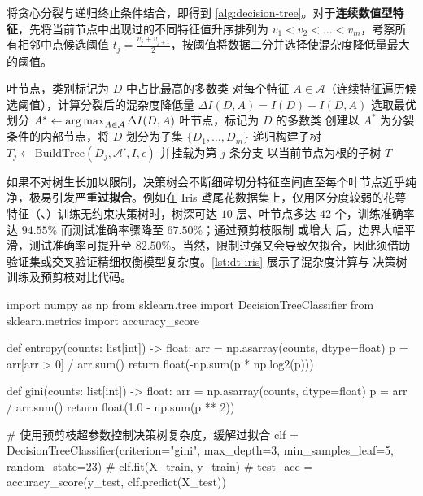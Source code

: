 将贪心分裂与递归终止条件结合，即得到 \cref{alg:decision-tree}。对于\textbf{连续数值型特征}，先将当前节点中出现过的不同特征值升序排列为 $v_1 < v_2 < \dots < v_m$，考察所有相邻中点候选阈值 $t_j = \frac{v_j + v_{j+1}}{2}$，按阈值将数据二分并选择使混杂度降低量最大的阈值。

\begin{algorithm}[决策树贪心递归构建算法]\label{alg:decision-tree}
\begin{algsteps}
    \State \Return 叶节点，类别标记为 $D$ 中占比最高的多数类
  \EndIf
  \State 对每个特征 $A\in\mathcal{A}$（连续特征遍历候选阈值），计算分裂后的混杂度降低量 $\Delta I(D, A) = I(D) - I(D, A)$
  \State 选取最优划分 $A^* \gets \operatorname*{arg\,max}_{A\in\mathcal{A}} \Delta I(D, A)$
    \State \Return 叶节点，标记为 $D$ 的多数类
  \EndIf
  \State 创建以 $A^*$ 为分裂条件的内部节点，将 $D$ 划分为子集 $\{D_1, \dots, D_m\}$
    \State 递归构建子树 $T_j \gets \text{BuildTree}(D_j, \mathcal{A}', I, \epsilon)$ 并挂载为第 $j$ 条分支
  \EndFor
  \State \Return 以当前节点为根的子树 $T$
\end{algsteps}
\end{algorithm}

如果不对树生长加以限制，决策树会不断细碎切分特征空间直至每个叶节点近乎纯净，极易引发严重\textbf{过拟合}。例如在 Iris 鸢尾花数据集上，仅用区分度较弱的花萼特征（、）训练无约束决策树时，树深可达 $10$ 层、叶节点多达 $42$ 个，训练准确率达 $94.55\%$ 而测试准确率骤降至 $67.50\%$；通过预剪枝限制  或增大  后，边界大幅平滑，测试准确率可提升至 $82.50\%$。当然，限制过强又会导致欠拟合，因此须借助验证集或交叉验证精细权衡模型复杂度。\cref{lst:dt-iris} 展示了混杂度计算与  决策树训练及预剪枝对比代码。

\begin{codeblock}[language=Python,caption={信息熵/基尼指数计算与 scikit-learn 决策树预剪枝示例},label=lst:dt-iris]
import numpy as np
from sklearn.tree import DecisionTreeClassifier
from sklearn.metrics import accuracy_score

def entropy(counts: list[int]) -> float:
    arr = np.asarray(counts, dtype=float)
    p = arr[arr > 0] / arr.sum()
    return float(-np.sum(p * np.log2(p)))

def gini(counts: list[int]) -> float:
    arr = np.asarray(counts, dtype=float)
    p = arr / arr.sum()
    return float(1.0 - np.sum(p ** 2))

# 使用预剪枝超参数控制决策树复杂度，缓解过拟合
clf = DecisionTreeClassifier(criterion="gini", max_depth=3, min_samples_leaf=5, random_state=23)
# clf.fit(X_train, y_train)
# test_acc = accuracy_score(y_test, clf.predict(X_test))
\end{codeblock}

